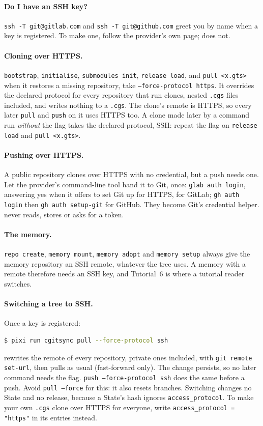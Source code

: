\paragraph{Do I have an SSH key?} \texttt{ssh -T git@gitlab.com} and
\texttt{ssh -T git@github.com} greet you by name when a key is registered.
To make one, follow the provider's own page; \cgscli{} does not.

\paragraph{Cloning over HTTPS.} \texttt{bootstrap}, \texttt{initialise},
\texttt{submodules init}, \texttt{release load}, and \texttt{pull <x.gts>}
when it restores a missing repository, take \texttt{--force-protocol https}.
It overrides the declared protocol for every repository that run clones,
nested \texttt{.cgs} files included, and writes nothing to a \texttt{.cgs}.
The clone's remote is HTTPS, so every later \texttt{pull} and \texttt{push}
on it uses HTTPS too. A clone made later by a command run \emph{without} the
flag takes the declared protocol, SSH: repeat the flag on \texttt{release
load} and \texttt{pull <x.gts>}.

\paragraph{Pushing over HTTPS.} A public repository clones over HTTPS with
no credential, but a push needs one. Let the provider's command-line tool
hand it to Git, once: \texttt{glab auth login}, answering yes when it offers
to set Git up for HTTPS, for GitLab; \texttt{gh auth login} then
\texttt{gh auth setup-git} for GitHub. They become Git's credential helper.
\cgscli{} never reads, stores or asks for a token.

\paragraph{The memory.} \texttt{repo create}, \texttt{memory mount},
\texttt{memory adopt} and \texttt{memory setup} always give the memory
repository an SSH remote, whatever the tree uses. A memory with a remote
therefore needs an SSH key, and Tutorial~6 is where a tutorial reader
switches.

\paragraph{Switching a tree to SSH.} Once a key is registered:
\begin{lstlisting}[language=bash]
$ pixi run cgitsync pull --force-protocol ssh
\end{lstlisting}
rewrites the remote of every repository, private ones included, with
\texttt{git remote set-url}, then pulls as usual (fast-forward only). The
change persists, so no later command needs the flag. \texttt{push
--force-protocol ssh} does the same before a push. Avoid \texttt{pull
--force} for this: it also resets branches. Switching changes no State and
no release, because a State's hash ignores \texttt{access\_protocol}. To make
your own \texttt{.cgs} clone over HTTPS for everyone, write
\texttt{access\_protocol = "https"} in its entries instead.

